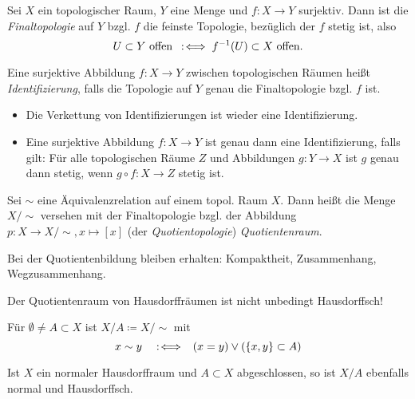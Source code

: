 \documentclass{cheat-sheet}
\begin{document}
\begin{defn}
  Sei $X$ ein topologischer Raum, $Y$ eine Menge und $f : X \to Y$ surjektiv. Dann ist die \emph{Finaltopologie} auf $Y$ bzgl. $f$ die feinste Topologie, bezüglich der $f$ stetig ist, also
  \[ U \subset Y \text{ offen} \enspace:\!\iff f^{-1}(U) \subset X \text{ offen}. \]
\end{defn}

\begin{defn}
  Eine surjektive Abbildung $f : X \to Y$ zwischen topologischen Räumen heißt \emph{Identifizierung}, falls die Topologie auf $Y$ genau die Finaltopologie bzgl. $f$ ist.
\end{defn}

\begin{prop}
  \begin{itemize}
    \item Die Verkettung von Identifizierungen ist wieder eine Identifizierung.
    \item Eine surjektive Abbildung $f : X  \to Y$ ist genau dann eine Identifizierung, falls gilt: Für alle topologischen Räume $Z$ und Abbildungen $g : Y \to X$ ist $g$ genau dann stetig, wenn $g \circ f : X \to Z$ stetig ist.
  \end{itemize}
\end{prop}

\begin{defn}
  Sei ${\sim}$ eine Äquivalenzrelation auf einem topol. Raum $X$. Dann heißt die Menge $X/{\sim}$ versehen mit der Finaltopologie bzgl. der Abbildung $p : X \to X/{\sim}, x \mapsto [x]$ (der \emph{Quotientopologie}) \emph{Quotientenraum}.
\end{defn}

\begin{bem}
  Bei der Quotientenbildung bleiben erhalten: Kompaktheit, Zusammenhang, Wegzusammenhang.
\end{bem}

\begin{acht}
  Der Quotientenraum von Hausdorffräumen ist nicht unbedingt Hausdorffsch!
\end{acht}

\begin{nota}
  Für $\emptyset \not= A \subset X$ ist $X/A \coloneqq X/{\sim}$ mit
  \[ x \sim y \enspace \enspace:\!\iff \enspace (x = y) \vee (\{ x, y \} \subset A) \]
\end{nota}

\begin{prop}
  Ist $X$ ein normaler Hausdorffraum und $A \subset X$ abgeschlossen, so ist $X/A$ ebenfalls normal und Hausdorffsch.
\end{prop}
\end{document}
